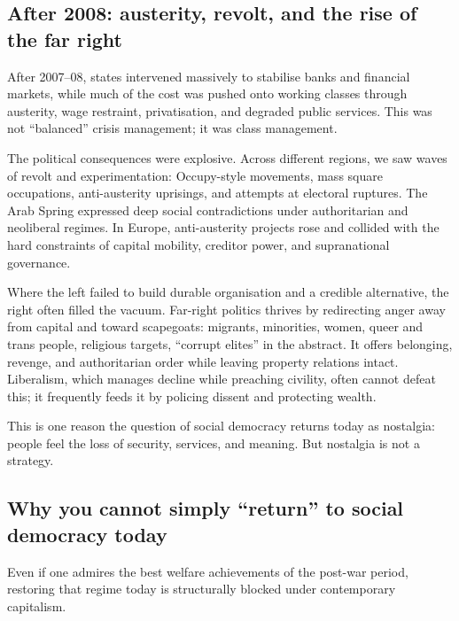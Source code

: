 \subsection{After 2008: austerity, revolt, and the rise of the far right}
\label{subsec:post-2008}

After 2007--08, states intervened massively to stabilise banks and financial markets, while much of the cost was pushed
onto working classes through austerity, wage restraint, privatisation, and degraded public services. This was not
``balanced'' crisis management; it was class management.

The political consequences were explosive. Across different regions, we saw waves of revolt and experimentation:
Occupy-style movements, mass square occupations, anti-austerity uprisings, and attempts at electoral ruptures. The Arab
Spring expressed deep social contradictions under authoritarian and neoliberal regimes. In Europe, anti-austerity
projects rose and collided with the hard constraints of capital mobility, creditor power, and supranational governance.

Where the left failed to build durable organisation and a credible alternative, the right often filled the vacuum.
Far-right politics thrives by redirecting anger away from capital and toward scapegoats: migrants, minorities, women,
queer and trans people, religious targets, ``corrupt elites'' in the abstract. It offers belonging, revenge, and
authoritarian order while leaving property relations intact. Liberalism, which manages decline while preaching civility,
often cannot defeat this; it frequently feeds it by policing dissent and protecting wealth.

This is one reason the question of social democracy returns today as nostalgia: people feel the loss of security,
services, and meaning. But nostalgia is not a strategy.

\subsection{Why you cannot simply ``return'' to social democracy today}
\label{subsec:no-return-socdem}

Even if one admires the best welfare achievements of the post-war period, restoring that regime today is structurally
blocked under contemporary capitalism.

